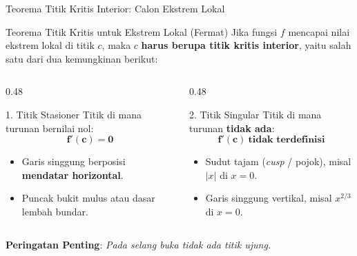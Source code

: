 \documentclass[aspectratio=43,10pt]{beamer}
\begin{document}
\begin{frame}{Teorema Titik Kritis Interior: Calon Ekstrem Lokal}
    \begin{block}{Teorema Titik Kritis untuk Ekstrem Lokal (Fermat)}
        Jika fungsi $f$ mencapai nilai ekstrem lokal di titik $c$, maka $c$ \textbf{harus berupa titik kritis interior}, yaitu salah satu dari dua kemungkinan berikut:
    \end{block}

    \vspace{0.06cm}
    \begin{columns}[T]
        \begin{column}{0.48\textwidth}
            \begin{exampleblock}{1. Titik Stasioner}
                Titik di mana turunan bernilai nol:
                \[
                    \mathbf{f'(c) = 0}
                \]
                \begin{itemize}
                    \item Garis singgung berposisi \textbf{mendatar horizontal}.
                    \item Puncak bukit mulus atau dasar lembah bundar.
                \end{itemize}
            \end{exampleblock}
        \end{column}

        \begin{column}{0.48\textwidth}
            \begin{alertblock}{2. Titik Singular}
                Titik di mana turunan \textbf{tidak ada}:
                \[
                    \mathbf{f'(c)\ \text{tidak terdefinisi}}
                \]
                \begin{itemize}
                    \item Sudut tajam (\textit{cusp} / pojok), misal $|x|$ di $x=0$.
                    \item Garis singgung vertikal, misal $x^{2/3}$ di $x=0$.
                \end{itemize}
            \end{alertblock}
        \end{column}
    \end{columns}

    \vspace{0.08cm}
    \centering
    {\scriptsize \color{CoralRose} \textbf{Peringatan Penting}: \textit{Pada selang buka tidak ada titik ujung.}}
\end{frame}
\end{document}
